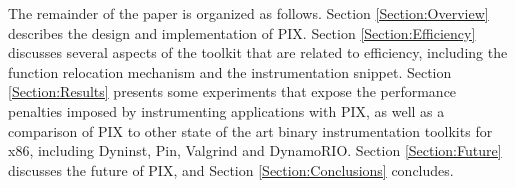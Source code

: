 The remainder of the paper is organized as follows. Section
\ref{Section:Overview} describes the design and implementation of PIX.
Section \ref{Section:Efficiency} discusses
several aspects of the toolkit that are related to efficiency, including the function relocation mechanism and the
instrumentation snippet. Section \ref{Section:Results} presents some
experiments that expose the performance penalties imposed by instrumenting applications with PIX, as well as
a comparison of PIX to other state of the art binary instrumentation toolkits for x86, including Dyninst, Pin, Valgrind and DynamoRIO. Section
\ref{Section:Future} discusses the future of PIX, and Section \ref{Section:Conclusions} concludes.
